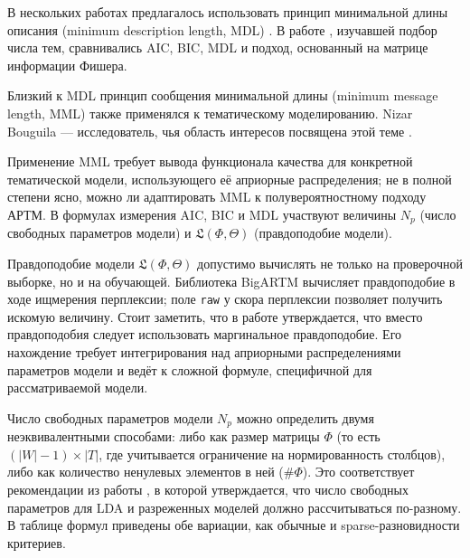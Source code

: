 В нескольких работах предлагалось  использовать принцип минимальной длины описания (minimum description length, MDL) \cite{image_segm,gerlach2018network}. В работе \cite{mml0}, изучавшей подбор числа тем, сравнивались AIC, BIC, MDL и подход, основанный на матрице информации Фишера.

Близкий к MDL принцип сообщения минимальной длины (minimum message length, MML) также применялся к тематическому моделированию. Nizar Bouguila --- исследователь, чья область интересов посвящена этой теме \cite{mml1}\cite{mml2}\cite{mml3}\cite{mml4}\cite{mml5}. 

Применение MML требует вывода функционала качества для конкретной тематической модели, использующего её априорные распределения; не в полной степени ясно, можно ли адаптировать MML к полувероятностному подходу АРТМ. В формулах измерения AIC, BIC и MDL участвуют величины $N_p$ (число свободных параметров модели) и $\mathfrak{L}(\Phi,\Theta)$ (правдоподобие модели). 

Правдоподобие модели $\mathfrak{L}(\Phi,\Theta)$ допустимо вычислять не только на проверочной выборке, но и на обучающей. Библиотека BigARTM вычисляет правдоподобие в ходе ищмерения перплексии; поле \texttt{raw} у скора перплексии позволяет получить искомую величину. Стоит заметить, что в работе \cite{gerlach2018network} утверждается, что вместо правдоподобия следует использовать маргинальное правдоподобие. Его нахождение требует интегрирования над априорными распределениями параметров модели и ведёт к сложной формуле, специфичной для рассматриваемой модели.

Число свободных параметров модели $N_p$ можно определить двумя неэквивалентными способами: либо как размер матрицы $\Phi$ (то есть $(|W|-1) \times |T|$, где учитывается ограничение на нормированность столбцов), либо как количество ненулевых элементов в ней ($\#\Phi$). Это соответствует рекомендации из работы \cite{than2012fully}, в которой утверждается, что число свободных параметров для LDA и разреженных моделей должно рассчитываться по-разному. В таблице формул приведены обе вариации, как обычные и sparse-разновидности критериев.

